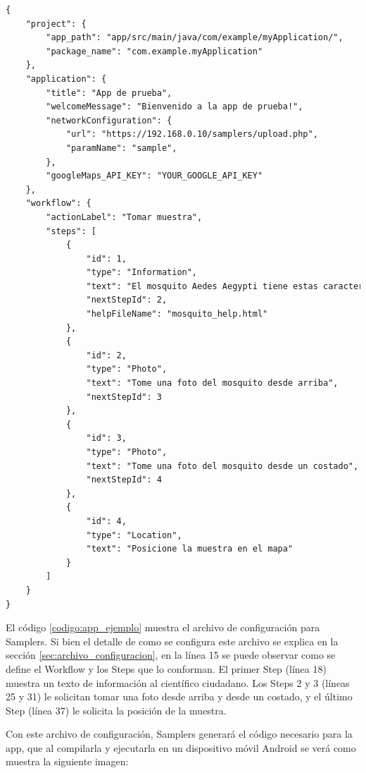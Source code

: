 \clearpage

\begin{lstlisting}[language=XML, frame=tlbr, label={codigo:app_ejemplo}, caption=Archivo de configuración para Samplers de la app ejemplo.]
{
	"project": {
		"app_path": "app/src/main/java/com/example/myApplication/",
		"package_name": "com.example.myApplication"
	},
	"application": {
		"title": "App de prueba",
		"welcomeMessage": "Bienvenido a la app de prueba!",
		"networkConfiguration": {
			"url": "https://192.168.0.10/samplers/upload.php",
			"paramName": "sample",
		},
		"googleMaps_API_KEY": "YOUR_GOOGLE_API_KEY"
	},
	"workflow": {
		"actionLabel": "Tomar muestra",
		"steps": [
			{
				"id": 1,
				"type": "Information",
				"text": "El mosquito Aedes Aegypti tiene estas características: \n 1) Es negro\n 2) Tiene rayas blancas en cuerpo y patas",
				"nextStepId": 2,
				"helpFileName": "mosquito_help.html"				
			}, 
			{
				"id": 2,
				"type": "Photo",
				"text": "Tome una foto del mosquito desde arriba",
				"nextStepId": 3
			},			
			{
				"id": 3,
				"type": "Photo",
				"text": "Tome una foto del mosquito desde un costado",
				"nextStepId": 4
			},
			{
				"id": 4,
				"type": "Location",
				"text": "Posicione la muestra en el mapa"
			}
		]
	}
}
\end{lstlisting}

El código \ref{codigo:app_ejemplo} muestra el archivo de configuración para Samplers. Si bien el detalle de como se configura este archivo se explica en la sección \ref{sec:archivo_configuracion}, en la línea 15 se puede observar como se define el Workflow y los Steps que lo conforman. El primer Step (línea 18) muestra un texto de información al científico ciudadano. Los Steps 2 y 3 (líneas 25 y 31) le solicitan tomar una foto desde arriba y desde un costado, y el último Step (línea 37) le solicita la posición de la muestra.


Con este archivo de configuración, Samplers generará el código necesario para la app, que al compilarla y ejecutarla en un dispositivo móvil Android se verá como muestra la siguiente imagen:



